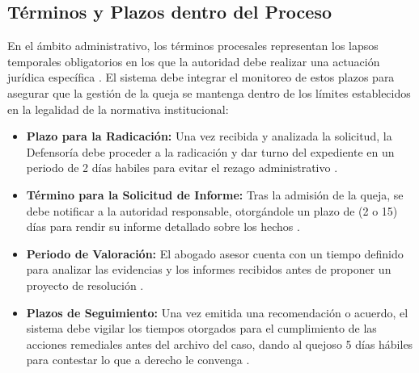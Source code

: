 \subsection{Términos y Plazos dentro del Proceso}
En el ámbito administrativo, los términos procesales representan los lapsos temporales obligatorios en los que la autoridad debe realizar una actuación jurídica específica \cite{5} . El sistema debe integrar el monitoreo de estos plazos para asegurar que la gestión de la queja se mantenga dentro de los límites establecidos en la legalidad de la normativa institucional:
\begin{itemize}
    \item \textbf{Plazo para la Radicación:} Una vez recibida y analizada la solicitud, la Defensoría debe proceder a la radicación y dar turno del expediente en un periodo de 2 días habiles para evitar el rezago administrativo \cite{5} .
    \item \textbf{Término para la Solicitud de Informe:} Tras la admisión de la queja, se debe notificar a la autoridad responsable, otorgándole un plazo de (2 o 15) días para rendir su informe detallado sobre los hechos \cite{5} .
    \item \textbf{Periodo de Valoración:}  El abogado asesor cuenta con un tiempo definido para analizar las evidencias y los informes recibidos antes de proponer un proyecto de resolución \cite{5} .
    \item \textbf{Plazos de Seguimiento:} Una vez emitida una recomendación o acuerdo, el sistema debe vigilar los tiempos otorgados para el cumplimiento de las acciones remediales antes del archivo del caso, dando al quejoso 5 días hábiles para contestar lo que a derecho le convenga \cite{5} .
\end{itemize}

